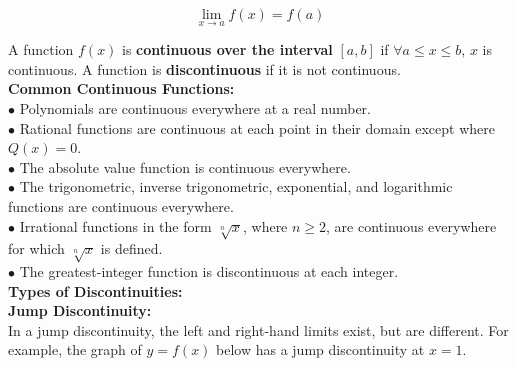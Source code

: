 \documentclass{article}
\begin{document}
            \begin{equation*}
                \lim_{x\to a}f(x)=f(a)
            \end{equation*}

            \noindent A function $f(x)$ is \textbf{continuous over the interval} $[a,b]$ if
            $\forall a\leq x\leq b$, $x$ is continuous. A function is \textbf{discontinuous} if it
            is not continuous. \\

            \noindent \color{purple} \textbf{Common Continuous Functions:} \color{black} \\
            $\bullet$ Polynomials are continuous everywhere at a real number. \\
            $\bullet$ Rational functions are continuous at each point in their domain except where
            $Q(x)=0$. \\
            $\bullet$ The absolute value function is continuous everywhere. \\
            $\bullet$ The trigonometric, inverse trigonometric, exponential, and logarithmic functions
            are continuous everywhere. \\
            $\bullet$ Irrational functions in the form $\sqrt[n]{x}$, where $n\geq 2$, are continuous
            everywhere for which $\sqrt[n]{x}$ is defined. \\
            $\bullet$ The greatest-integer function is discontinuous at each integer. \\

            \noindent \color{purple} \textbf{Types of Discontinuities:} \\
            \noindent \textbf{Jump Discontinuity:} \color{black} \\
            In a jump discontinuity, the left and right-hand limits exist, but are different.
            For example, the graph of $y=f(x)$ below has a jump discontinuity at $x=1$. \\
\end{document}
